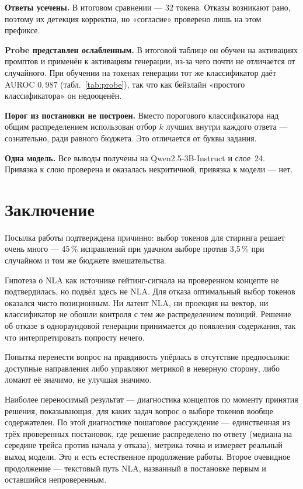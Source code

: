 \documentclass[11pt,a4paper]{article}
\begin{document}
\textbf{Ответы усечены.} В итоговом сравнении --- 32 токена. Отказы возникают
рано, поэтому их детекция корректна, но «согласие» проверено лишь на этом
префиксе.

\textbf{Probe представлен ослабленным.} В итоговой таблице он обучен на
активациях промптов и применён к активациям генерации, из-за чего почти не
отличается от случайного. При обучении на токенах генерации тот же классификатор
даёт AUROC $0{,}987$ (табл.~\ref{tab:probe}), так что как бейзлайн «простого
классификатора» он недооценён.

\textbf{Порог из постановки не построен.} Вместо порогового классификатора над
общим распределением использован отбор $k$ лучших внутри каждого ответа ---
сознательно, ради равного бюджета. Это отличается от буквы задания.

\textbf{Одна модель.} Все выводы получены на Qwen2.5-3B-Instruct и слое~24.
Привязка к слою проверена и оказалась некритичной, привязка к модели --- нет.

\section{Заключение}

Посылка работы подтверждена причинно: выбор токенов для стиринга решает очень
много --- 45\,\% исправлений при удачном выборе против 3{,}5\,\% при случайном
и том же бюджете вмешательства.

Гипотеза о NLA как источнике гейтинг-сигнала на проверенном концепте не
подтвердилась, но подвёл здесь не NLA. Для отказа оптимальный выбор токенов
оказался чисто позиционным. Ни латент NLA, ни проекция на вектор, ни
классификатор не обошли контроля с тем же распределением позиций. Решение об
отказе в однораундовой генерации принимается до появления содержания, так что
интерпретировать попросту нечего.

Попытка перенести вопрос на правдивость упёрлась в отсутствие предпосылки:
доступные направления либо управляют метрикой в неверную сторону, либо ломают её
значимо, не улучшая значимо.

Наиболее переносимый результат --- диагностика концептов по моменту принятия
решения, показывающая, для каких задач вопрос о выборе токенов вообще
содержателен. По этой диагностике пошаговое рассуждение --- единственная из трёх
проверенных постановок, где решение распределено по ответу (медиана на середине
трейса против начала у отказа), метрика точна и измеряет реальный выход модели.
Это и есть естественное продолжение работы. Второе очевидное продолжение ---
текстовый путь NLA, названный в постановке первым и оставшийся непроверенным.
\end{document}

